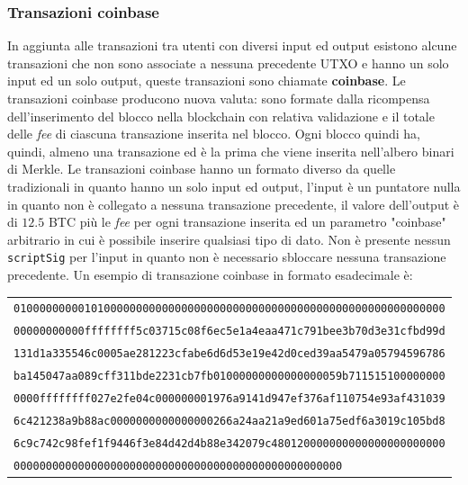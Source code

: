 \begin{enumerate}[1.]
\subsubsection{Transazioni coinbase}
In aggiunta alle transazioni tra utenti con diversi input ed output esistono alcune transazioni che non sono associate a nessuna precedente UTXO e hanno un solo input ed un solo output, queste transazioni sono chiamate \textbf{coinbase}.\newline
Le transazioni coinbase producono nuova valuta: sono formate dalla ricompensa dell'inserimento del blocco nella blockchain con relativa validazione e il totale delle \textit{fee} di ciascuna transazione inserita nel blocco. Ogni blocco quindi ha, quindi, almeno una transazione ed è la prima che viene inserita nell'albero binari di Merkle.\newline
Le transazioni coinbase hanno un formato diverso da quelle tradizionali in quanto hanno un solo input ed output, l'input è un puntatore nulla in quanto non è collegato a nessuna transazione precedente, il valore dell'output è di $12.5$ BTC più le \textit{fee} per ogni transazione inserita ed un parametro "coinbase" arbitrario in cui è possibile inserire qualsiasi tipo di dato. Non è presente nessun \texttt{scriptSig} per l'input in quanto non è necessario sbloccare nessuna transazione precedente.\newline
Un esempio di transazione coinbase in formato esadecimale è:
\begin{table}[H]
    \begin{tabular}{l}
        \texttt{0100000000010100000000000000000000000000000000000000000000000000000}\\
        \texttt{00000000000ffffffff5c03715c08f6ec5e1a4eaa471c791bee3b70d3e31cfbd99d}\\
        \texttt{131d1a335546c0005ae281223cfabe6d6d53e19e42d0ced39aa5479a05794596786}\\
        \texttt{ba145047aa089cff311bde2231cb7fb01000000000000000059b711515100000000}\\
        \texttt{0000ffffffff027e2fe04c000000001976a9141d947ef376af110754e93af431039}\\
        \texttt{6c421238a9b88ac0000000000000000266a24aa21a9ed601a75edf6a3019c105bd8}\\
        \texttt{6c9c742c98fef1f9446f3e84d42d4b88e342079c480120000000000000000000000}\\
        \texttt{000000000000000000000000000000000000000000000000000}
    \end{tabular}

\end{table}
\end{enumerate}
